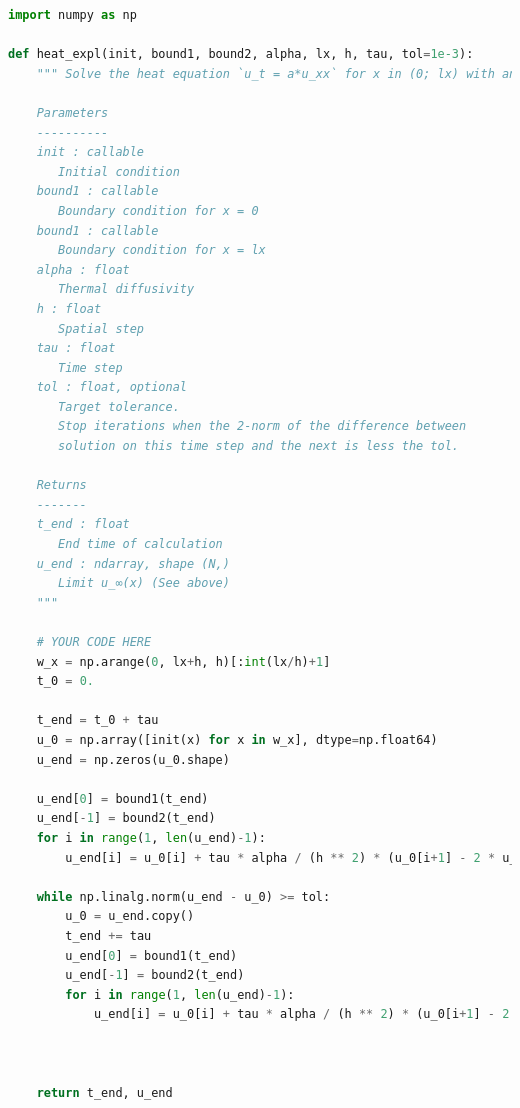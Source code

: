\begin{lstlisting}[language=Python, caption=Реализация явного метода на языке Python, label=expl]
import numpy as np

def heat_expl(init, bound1, bound2, alpha, lx, h, tau, tol=1e-3):
    """ Solve the heat equation `u_t = a*u_xx` for x in (0; lx) with an explicit scheme.
    
    Parameters
    ----------
    init : callable
       Initial condition
    bound1 : callable
       Boundary condition for x = 0
    bound1 : callable
       Boundary condition for x = lx
    alpha : float
       Thermal diffusivity
    h : float
       Spatial step
    tau : float
       Time step
    tol : float, optional
       Target tolerance.
       Stop iterations when the 2-norm of the difference between 
       solution on this time step and the next is less the tol.
       
    Returns
    -------
    t_end : float
       End time of calculation
    u_end : ndarray, shape (N,)
       Limit u_∞(x) (See above)
    """
    
    # YOUR CODE HERE
    w_x = np.arange(0, lx+h, h)[:int(lx/h)+1]
    t_0 = 0.
    
    t_end = t_0 + tau
    u_0 = np.array([init(x) for x in w_x], dtype=np.float64)
    u_end = np.zeros(u_0.shape)
    
    u_end[0] = bound1(t_end)
    u_end[-1] = bound2(t_end)
    for i in range(1, len(u_end)-1):
        u_end[i] = u_0[i] + tau * alpha / (h ** 2) * (u_0[i+1] - 2 * u_0[i] + u_0[i-1])
    
    while np.linalg.norm(u_end - u_0) >= tol:
        u_0 = u_end.copy()
        t_end += tau
        u_end[0] = bound1(t_end)
        u_end[-1] = bound2(t_end)
        for i in range(1, len(u_end)-1):
            u_end[i] = u_0[i] + tau * alpha / (h ** 2) * (u_0[i+1] - 2 * u_0[i] + u_0[i-1])
    
    
    
    return t_end, u_end

\end{lstlisting}

\newpage


